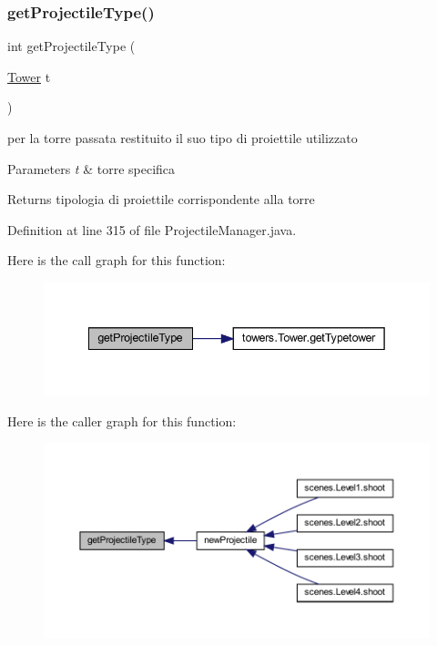 \subsubsection{\texorpdfstring{get\+Projectile\+Type()}{getProjectileType()}}
{\footnotesize\ttfamily int get\+Projectile\+Type (\begin{DoxyParamCaption}\item[{\hyperlink{classtowers_1_1_tower}{Tower}}]{t }\end{DoxyParamCaption})}



per la torre passata restituito il suo tipo di proiettile utilizzato 


\begin{DoxyParams}{Parameters}
{\em t} & torre specifica\\
\hline
\end{DoxyParams}
\begin{DoxyReturn}{Returns}
tipologia di proiettile corrispondente alla torre 
\end{DoxyReturn}


Definition at line 315 of file Projectile\+Manager.\+java.

Here is the call graph for this function\+:\nopagebreak
\begin{figure}[H]
\begin{center}
\leavevmode
\includegraphics[width=342pt]{classmanagers_1_1_projectile_manager_a942d732bac65df2f0d220989ca42ce76_cgraph}
\end{center}
\end{figure}
Here is the caller graph for this function\+:
\nopagebreak
\begin{figure}[H]
\begin{center}
\leavevmode
\includegraphics[width=350pt]{classmanagers_1_1_projectile_manager_a942d732bac65df2f0d220989ca42ce76_icgraph}
\end{center}
\end{figure}
\mbox{\label{classmanagers_1_1_projectile_manager_a78da03d9c5782fb25189cee3d4c78bfd}} 
